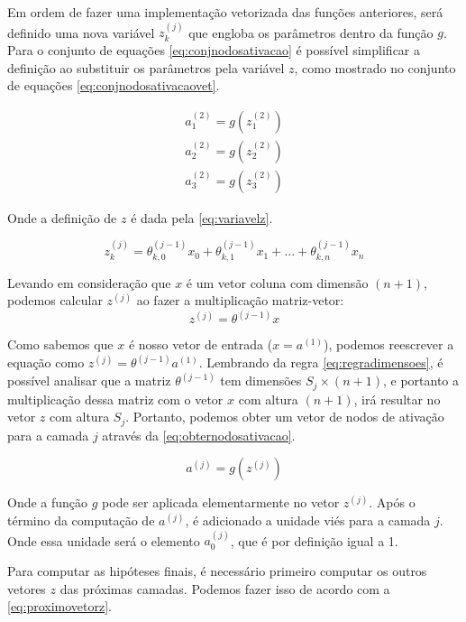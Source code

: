 Em ordem de fazer uma implementação vetorizada das funções anteriores, será definido uma nova variável $z_k^{(j)}$ que engloba os parâmetros dentro da função $g$. Para o conjunto de equações \ref{eq:conjnodosativacao} é possível simplificar a definição ao substituir os parâmetros pela variável $z$, como mostrado no conjunto de equações \ref{eq:conjnodosativacaovet}.

\begin{align}
a_1^{(2)} = g(z_1^{(2)}) \nonumber \\
a_2^{(2)} = g(z_2^{(2)}) \nonumber \\
a_3^{(2)} = g(z_3^{(2)}) \label{eq:conjnodosativacaovet}
\end{align}

Onde a definição de $z$ é dada pela \autoref{eq:variavelz}.

\begin{equation} \label{eq:variavelz}
z_k^{(j)} = \theta_{k,0}^{(j-1)}x_0 + \theta_{k,1}^{(j-1)}x_1 + \ldots + \theta_{k,n}^{(j-1)}x_n 
\end{equation}

Levando em consideração que $x$ é um vetor coluna com dimensão $(n+1)$, podemos calcular $z^{(j)}$ ao fazer a multiplicação matriz-vetor:
\begin{equation}
z^{(j)} = \theta^{(j-1)}x \nonumber
\end{equation}

Como sabemos que $x$ é nosso vetor de entrada ($x = a^{(1)}$), podemos reescrever a equação como $z^{(j)} = \theta^{(j-1)}a^{(1)}$. Lembrando da regra \ref{eq:regradimensoes}, é possível analisar que a matriz  $\theta^{(j-1)}$ tem dimensões $S_j \times (n+1)$, e portanto a multiplicação dessa matriz com o vetor $x$ com altura $(n+1)$, irá resultar no vetor $z$ com altura $S_j$. Portanto, podemos obter um vetor de nodos de ativação para a camada $j$ através da \autoref{eq:obternodosativacao}.

\begin{equation} \label{eq:obternodosativacao}
a^{(j)} = g(z^{(j)}) 
\end{equation}

Onde a função $g$ pode ser aplicada elementarmente no vetor $z^{(j)}$. Após o término da computação de $a^{(j)}$, é adicionado a unidade viés para a camada $j$. Onde essa unidade será o elemento $a_0^{(j)}$, que é por definição igual a 1.

Para computar as hipóteses finais, é necessário primeiro computar os outros vetores $z$ das próximas camadas. Podemos fazer isso de acordo com a \autoref{eq:proximovetorz}.

